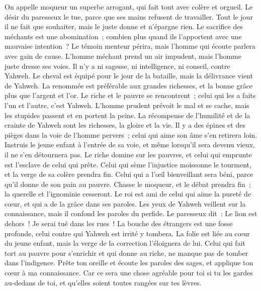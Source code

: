 \begin{multicols}{2}
On appelle moqueur un superbe arrogant, qui fait tout avec colère et orgueil.
Le désir du paresseux le tue, parce que ses mains refusent de travailler.
Tout le jour il ne fait que souhaiter, mais le juste donne et n'épargne rien.
Le sacrifice des méchants est une abomination~; combien plus quand ils l'apportent avec une mauvaise intention~?
Le témoin menteur périra, mais l'homme qui écoute parlera avec gain de cause.
L'homme méchant prend un air impudent, mais l'homme juste dresse ses voies.
Il n'y a ni sagesse, ni intelligence, ni conseil, contre Yahweh.
Le cheval est équipé pour le jour de la bataille, mais la délivrance vient de Yahweh.
\VerseOne{}La renommée est préférable aux grandes richesses, et la bonne grâce plus que l'argent et l'or.
Le riche et le pauvre se rencontrent~; celui qui les a faits l'un et l'autre, c'est Yahweh.
L'homme prudent prévoit le mal et se cache, mais les stupides passent et en portent la peine.
La récompense de l'humilité et de la crainte de Yahweh sont les richesses, la gloire et la vie.
Il y a des épines et des pièges dans la voie de l'homme pervers~; celui qui aime son âme s'en retirera loin.
Instruis le jeune enfant à l'entrée de sa voie, et même lorsqu'il sera devenu vieux, il ne s'en détournera pas.
Le riche domine sur les pauvres, et celui qui emprunte est l'esclave de celui qui prête.
Celui qui sème l'injustice moissonne le tourment, et la verge de sa colère prendra fin.
Celui qui a l'œil bienveillant sera béni, parce qu'il donne de son pain au pauvre.
Chasse le moqueur, et le débat prendra fin~; la querelle et l'ignominie cesseront.
Le roi est ami de celui qui aime la pureté de cœur, et qui a de la grâce dans ses paroles.
Les yeux de Yahweh veillent sur la connaissance, mais il confond les paroles du perfide.
Le paresseux dit~: Le lion est dehors~! Je serai tué dans les rues~!
La bouche des étrangers est une fosse profonde, celui contre qui Yahweh est irrité y tombera.
La folie est liée au cœur du jeune enfant, mais la verge de la correction l'éloignera de lui.
Celui qui fait tort au pauvre pour s'enrichir et qui donne au riche, ne manque pas de tomber dans l'indigence.
Prête ton oreille et écoute les paroles des sages, et applique ton cœur à ma connaissance.
Car ce sera une chose agréable pour toi si tu les gardes au-dedans de toi, et qu'elles soient toutes rangées sur tes lèvres.

\end{multicols}
